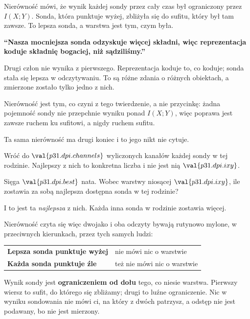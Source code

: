 \begin{fr}

Nierówność mówi, że wynik każdej sondy przez cały czas był ograniczony przez
$I(X; Y)$. Sonda, która punktuje wyżej, zbliżyła się do sufitu, który był
tam zawsze. To lepsza sonda, a warstwa jest tym, czym była.

\begin{trapbox}
\textbf{\enquote{Nasza mocniejsza sonda odzyskuje więcej składni, więc
reprezentacja koduje składnię bogaciej, niż sądziliśmy.}}

Drugi człon nie wynika z pierwszego. Reprezentacja koduje to, co koduje;
sonda stała się lepsza w odczytywaniu. To są różne zdania o różnych
obiektach, a zmierzone zostało tylko jedno z nich.

Nierówność jest tym, co czyni z tego twierdzenie, a nie przycinkę: żadna
pojemność sondy nie przepchnie wyniku ponad $I(X; Y)$, więc poprawa jest
zawsze ruchem ku sufitowi, a nigdy ruchem sufitu.
\end{trapbox}
\end{fr}

\begin{fr}
Ta sama nierówność ma drugi koniec i to jego nikt nie cytuje.

Wróć do $\val{p31.dpi.channels}$ wyliczonych kanałów \dash{} każdej sondy
w tej rodzinie. Najlepszy z nich to konkretna liczba i nie jest nią
$\val{p31.dpi.ixy}$.

Sięga $\val{p31.dpi.best}$ nata. Wobec warstwy niosącej
$\val{p31.dpi.ixy}$, ile zostawia za sobą najlepsza dostępna sonda w tej
rodzinie?
\dotline
\nextframe
\end{fr}

\begin{fr}

I to jest ta \emph{najlepsza} z nich. Każda inna sonda w rodzinie zostawia
więcej.

Nierówność czyta się więc dwojako i oba odczyty bywają rutynowo mylone, w
przeciwnych kierunkach, przez tych samych ludzi:

\begin{center}
\begin{tabular}{ll}
\toprule
\textbf{Lepsza sonda punktuje wyżej} & nie mówi nic o warstwie \\
\textbf{Każda sonda punktuje źle} & też nie mówi nic o warstwie \\
\bottomrule
\end{tabular}
\end{center}

Wynik sondy jest \textbf{ograniczeniem od dołu} tego, co niesie warstwa.
Pierwszy wiersz to sufit, do którego się zbliżamy; drugi to luźne
ograniczenie. Nic w wyniku sondowania nie mówi ci, na który z dwóch
patrzysz, a odstęp nie jest podawany, bo nie jest mierzony.
\end{fr}

